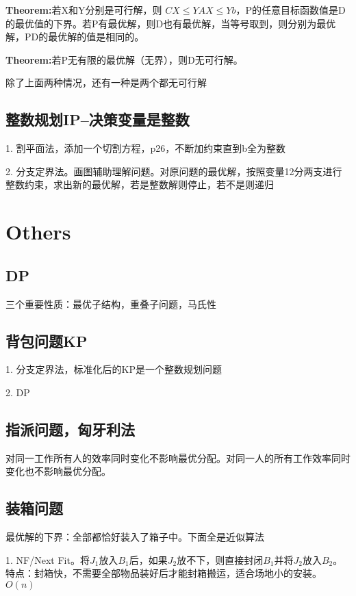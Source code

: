 \documentclass[letterpaper]{article}
\newcommand{\theo}{\textbf{Theorem:}}
\begin{document}
\theo 若X和Y分别是可行解，则 $CX \leq YAX \leq Yb$，P的任意目标函数值是D的最优值的下界。若P有最优解，则D也有最优解，当等号取到，则分别为最优解，PD的最优解的值是相同的。

\theo 若P无有限的最优解（无界），则D无可行解。

除了上面两种情况，还有一种是两个都无可行解


\subsection{整数规划IP--决策变量是整数}

1. 割平面法，添加一个切割方程，p26，不断加约束直到b全为整数

2. 分支定界法。画图辅助理解问题。对原问题的最优解，按照变量12分两支进行整数约束，求出新的最优解，若是整数解则停止，若不是则递归


\section{Others}

\subsection{DP}

三个重要性质：最优子结构，重叠子问题，马氏性

\subsection{背包问题KP}

1. 分支定界法，标准化后的KP是一个整数规划问题

2. DP

\subsection{指派问题，匈牙利法}

对同一工作所有人的效率同时变化不影响最优分配。对同一人的所有工作效率同时变化也不影响最优分配。

\subsection{装箱问题}

最优解的下界：全部都恰好装入了箱子中。下面全是近似算法

1. NF/Next Fit。将$J_1$放入$B_1$后，如果$J_2$放不下，则直接封闭$B_1$并将$J_2$放入$B_2$。特点：封箱快，不需要全部物品装好后才能封箱搬运，适合场地小的安装。$O(n)$
\end{document}
